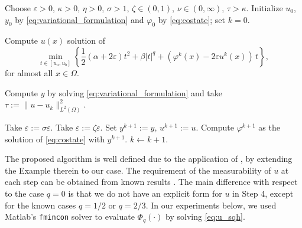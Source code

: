 {\begin{algorithm}[H]
\caption{Sequential Quadratic Hamiltonian method (SQH)}
\begin{algorithmic}[1]
    \State Choose $\varepsilon>0$, $\kappa>0$, $\eta>0$, $\sigma>1$, $\zeta\in(0,1)$, $\nu\in(0,\infty)$, $\tau>\kappa$.
    \State Initialize $u_0$, $y_0$ by \eqref{eq:variational_formulation} and $\varphi_0$ by \eqref{eq:costate}; set $k=0$.

    \While{$\tau > \kappa$}
        \State Compute $u(x)$ solution of
        \begin{equation}\label{eq:u_sqh} 
            \min_{t \in [u_a,u_b]} 
            \left\{
                \frac12(\alpha + 2\varepsilon)t^2 
                + \beta |t|^q
                + (\varphi^k(x) - 2\varepsilon u^k(x))\,t
            \right\},
        \end{equation}
        for almost all $x\in\Omega$.

        \State Compute $y$ by solving \eqref{eq:variational_formulation} and take $ \tau := \|u - u_k\|_{L^2(\Omega)}^2.$

            \State Take $\varepsilon := \sigma \varepsilon$.
        \Else 
            \State Take $\varepsilon := \zeta\varepsilon$.
            \State Set $y^{k+1} := y$, $u^{k+1} := u$.
            \State Compute $\varphi^{k+1}$ as the solution of \eqref{eq:costate} with $y^{k+1}$.
            \State $k \gets k+1$.
        \EndIf
    \EndWhile
\end{algorithmic}
\label{al:sqh}
\end{algorithm}



The proposed algorithm is well defined due to the application 
of \cite[Theorem 7.4]{borzi2023}, by extending the Example 
therein to our case. The requirement of the measurability of 
$u$ at each step can be obtained from known results 
\cite[Chapter 8]{aubin1990}. The main difference with 
respect to the case $q=0$ is that we do not have an explicit 
form for $u$ in Step 4, except for the known cases $q=1/2$ or 
$q=2/3$. In our experiments below, we used Matlab's 
\texttt{fmincon} solver to evaluate $\Phi_q(\cdot)$ by 
solving \eqref{eq:u_sqh}.


}
